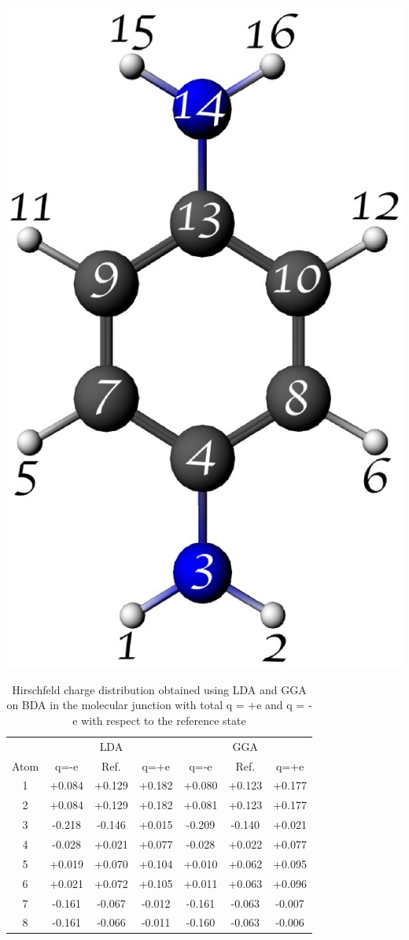 \documentclass[aip,jcp,a4paper,reprint,floatfix,superscriptaddress]{revtex4-1}
\begin{document}
\begin{table}
\caption{Hirschfeld charge distribution obtained using LDA and GGA on BDA in the molecular junction with total q = +e and q = -e with respect to the reference state}\label{tab:charges}
\includegraphics[width=0.5\columnwidth]{nums-molecule} 
\scriptsize{
\begin{tabular}{c|ccc|ccc}
\hline\hline
  & \multicolumn{1}{c}{} & \multicolumn{1}{c}{LDA} & \multicolumn{1}{c|}{}
  & \multicolumn{1}{c}{} & \multicolumn{1}{c}{GGA} \\[1pt] \cline{2-7}
 Atom & q=-e & Ref. & q=+e & q=-e & Ref. & q=+e \\ \cline{1-7}
 1   & +0.084 & +0.129 & +0.182 & +0.080 & +0.123 & +0.177 \\ 
 2   & +0.084 & +0.129 & +0.182 & +0.081 & +0.123 & +0.177 \\ 
 3   & -0.218 & -0.146 & +0.015 & -0.209 & -0.140 & +0.021 \\ 
 4   & -0.028 & +0.021 & +0.077 & -0.028 & +0.022 & +0.077 \\ 
 5   & +0.019 & +0.070 & +0.104 & +0.010 & +0.062 & +0.095 \\ 
 6   & +0.021 & +0.072 & +0.105 & +0.011 & +0.063 & +0.096 \\ 
 7   & -0.161 & -0.067 & -0.012 & -0.161 & -0.063 & -0.007 \\ 
 8   & -0.161 & -0.066 & -0.011 & -0.160 & -0.063 & -0.006 \\ 

\end{tabular}}
\end{table}
\end{document}

